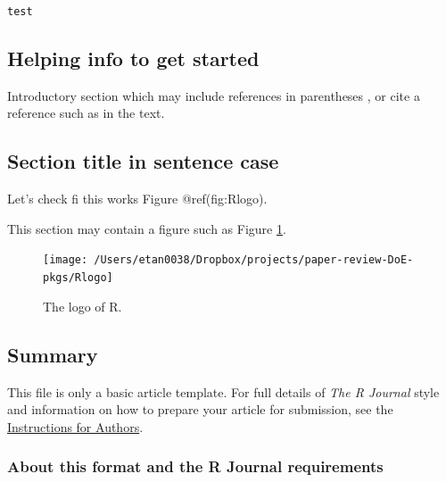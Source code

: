 \texttt{test} 




\hypertarget{helping-info-to-get-started}{%
\subsection{Helping info to get
started}\label{helping-info-to-get-started}}

Introductory section which may include references in parentheses
\citep{R}, or cite a reference such as \citet{R} in the text.

\hypertarget{section-title-in-sentence-case}{%
\subsection{Section title in sentence
case}\label{section-title-in-sentence-case}}

Let's check fi this works Figure @ref(fig:Rlogo).

This section may contain a figure such as Figure \ref{fig:Rlogo}.

\begin{Schunk}
\begin{figure}[htbp]

{\centering \texttt{[image: /Users/etan0038/Dropbox/projects/paper-review-DoE-pkgs/Rlogo]} 

}

\caption[The logo of R]{The logo of R.}\label{fig:Rlogo}
\end{figure}
\end{Schunk}

\hypertarget{summary}{%
\subsection{Summary}\label{summary}}

This file is only a basic article template. For full details of
\emph{The R Journal} style and information on how to prepare your
article for submission, see the
\href{https://journal.r-project.org/share/author-guide.pdf}{Instructions
for Authors}.

\hypertarget{about-this-format-and-the-r-journal-requirements}{%
\subsubsection{About this format and the R Journal
requirements}\label{about-this-format-and-the-r-journal-requirements}}

